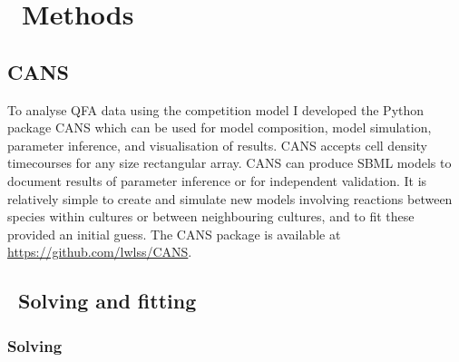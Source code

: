 \graphicspath{{images/}}

\section{\thesection~Methods}
\label{sec:methods}

\subsection{CANS}

To analyse QFA data using the competition model I developed the Python
package CANS which can be used for model composition, model
simulation, parameter inference, and visualisation of results. CANS
accepts cell density timecourses for any size rectangular array. CANS
can produce SBML models to document results of parameter inference or
for independent validation. It is relatively simple to create and
simulate new models involving reactions between species within
cultures or between neighbouring cultures, and to fit these provided
an initial guess. The CANS package is available at
\href{https://github.com/lwlss/CANS}{https://github.com/lwlss/CANS}.

\subsection{\thesubsection~Solving and fitting}

\subsubsection{Solving}
\label{sec:solving_comp}

